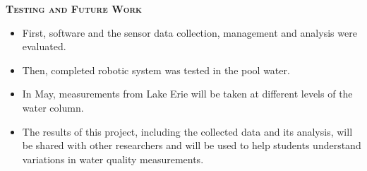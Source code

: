 \documentclass[final,t]{beamer}
\begin{document}
\begin{frame}{}
\begin{columns}
\begin{column}{.5\linewidth}
                \begin{alertblock}{\textsc{\textbf{Testing and Future Work}}}
                    \vspace*{3mm}
                    \begin{itemize}
                    	\item First, software and the sensor data collection,
                      management and analysis were evaluated.
                    	\item Then, completed robotic system was tested in the pool
                      water.
                    	\item In May, measurements from Lake Erie will be taken at
                      different levels of the water column.
                    	\item The results of this project, including the collected
                      data and its analysis, will be shared with other researchers
                      and will be used to help students understand variations in
                      water quality measurements.
                    \end{itemize}


                    \vspace*{3mm}
                \end{alertblock}
            \end{column}


        \end{columns}
    \end{frame}
\end{document}
